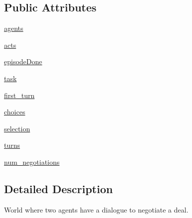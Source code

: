 \subsection*{Public Attributes}
\begin{DoxyCompactItemize}
\item 
\hyperlink{classparlai_1_1mturk_1_1tasks_1_1dealnodeal_1_1worlds_1_1MTurkDealNoDealDialogWorld_acc5597cd05b87753c3469fb199d606a2}{agents}
\item 
\hyperlink{classparlai_1_1mturk_1_1tasks_1_1dealnodeal_1_1worlds_1_1MTurkDealNoDealDialogWorld_a13200c06840e4af9142e7ae618d8aadb}{acts}
\item 
\hyperlink{classparlai_1_1mturk_1_1tasks_1_1dealnodeal_1_1worlds_1_1MTurkDealNoDealDialogWorld_ab9db614ebf4ef49ae3cb5c9d457dd94a}{episode\+Done}
\item 
\hyperlink{classparlai_1_1mturk_1_1tasks_1_1dealnodeal_1_1worlds_1_1MTurkDealNoDealDialogWorld_a56304056eb502fc650006f813463be53}{task}
\item 
\hyperlink{classparlai_1_1mturk_1_1tasks_1_1dealnodeal_1_1worlds_1_1MTurkDealNoDealDialogWorld_a2f5c4c36ef750abcc732aa69ecb40aed}{first\+\_\+turn}
\item 
\hyperlink{classparlai_1_1mturk_1_1tasks_1_1dealnodeal_1_1worlds_1_1MTurkDealNoDealDialogWorld_a8443d7268281402cc47e55bbb0e64852}{choices}
\item 
\hyperlink{classparlai_1_1mturk_1_1tasks_1_1dealnodeal_1_1worlds_1_1MTurkDealNoDealDialogWorld_aade83c7381db07e26f51d6a94479546d}{selection}
\item 
\hyperlink{classparlai_1_1mturk_1_1tasks_1_1dealnodeal_1_1worlds_1_1MTurkDealNoDealDialogWorld_aa0ef48dc444aa808a5aae96dfb750771}{turns}
\item 
\hyperlink{classparlai_1_1mturk_1_1tasks_1_1dealnodeal_1_1worlds_1_1MTurkDealNoDealDialogWorld_a89577b0e6dc72509d7ce67f899d48d75}{num\+\_\+negotiations}
\end{DoxyCompactItemize}


\subsection{Detailed Description}
\begin{DoxyVerb}World where two agents have a dialogue to negotiate a deal.
\end{DoxyVerb}
 

